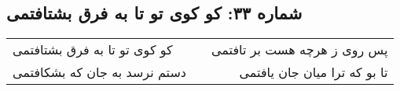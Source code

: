 \begin{center}
\section*{شماره ۳۳: کو کوی تو تا به فرق بشتافتمی}
\label{sec:033}
\begin{longtable}{l p{0.5cm} r}
کو کوی تو تا به فرق بشتافتمی
&&
پس روی ز هرچه هست بر تافتمی
\\
دستم نرسد به جان که بشکافتمی
&&
تا بو که ترا میان جان یافتمی
\\
\end{longtable}
\end{center}
